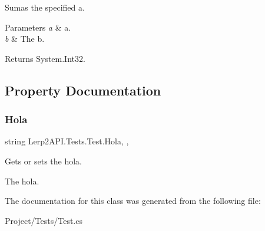 Sumas the specified a. 


\begin{DoxyParams}{Parameters}
{\em a} & a.\\
\hline
{\em b} & The b.\\
\hline
\end{DoxyParams}
\begin{DoxyReturn}{Returns}
System.\+Int32.
\end{DoxyReturn}


\subsection{Property Documentation}
\mbox{\label{class_lerp2_a_p_i_1_1_tests_1_1_test_a3d7e3cff727bb7047e49b310ab1ca9e9}} 
\subsubsection{\texorpdfstring{Hola}{Hola}}
{\footnotesize\ttfamily string Lerp2\+A\+P\+I.\+Tests.\+Test.\+Hola\hspace{0.3cm}{\ttfamily [static]}, {\ttfamily [get]}, {\ttfamily [set]}}



Gets or sets the hola. 

The hola.

The documentation for this class was generated from the following file\+:\begin{DoxyCompactItemize}
\item 
Project/\+Tests/Test.\+cs\end{DoxyCompactItemize}
